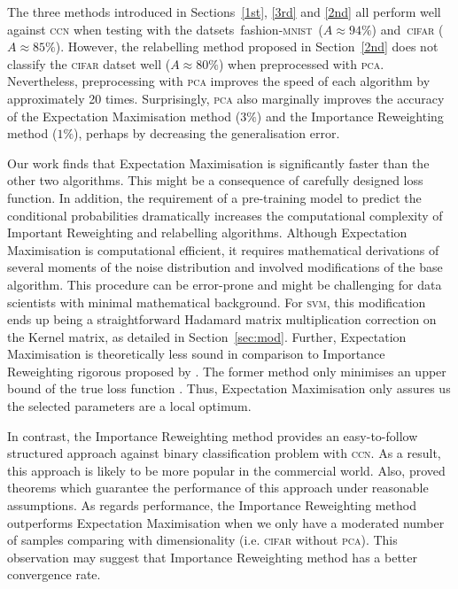 \documentclass[12pt]{article} %
\newcommand{\svm}{\textsc{svm}}
\newcommand{\mnist}{fashion-\textsc{mnist}}
\begin{document}

The three methods introduced in Sections~\ref{1st}, \ref{3rd} and \ref{2nd}  all perform well against \textsc{ccn} when testing with the datsets~\mnist\ ($A\approx 94\%$) and~\textsc{cifar} ($A\approx 85\%$). However, the relabelling method proposed in Section~\ref{2nd} does not classify the \textsc{cifar} datset well ($A\approx 80\%$) when preprocessed with \textsc{pca}. Nevertheless, preprocessing with \textsc{pca} improves the speed of each algorithm by approximately 20 times. Surprisingly, \textsc{pca} also marginally improves the accuracy of the Expectation Maximisation method ($3\%$) and the Importance Reweighting method ($1\%$), perhaps by decreasing the generalisation error.


Our work finds that Expectation Maximisation is significantly faster than the other two algorithms. This might be a consequence of carefully designed loss function. In addition, the requirement of a pre-training model to predict the conditional probabilities dramatically increases the computational complexity of Important Reweighting and relabelling algorithms. Although Expectation Maximisation is computational efficient, it requires mathematical derivations of several moments of the noise distribution and involved modifications of the base algorithm. This procedure can be error-prone and might be challenging for data scientists with minimal mathematical background. For \svm , this modification ends up being a straightforward Hadamard matrix multiplication correction on the Kernel matrix, as detailed in Section~\ref{sec:mod}. Further, Expectation Maximisation is theoretically less sound in comparison to Importance Reweighting rigorous proposed by \citet{liu2016classification}. The former method only minimises an upper bound of the true loss function \citep{NIPS1999_1672}. Thus, Expectation Maximisation only assures us the selected parameters are a local optimum.

In contrast, the Importance Reweighting method provides an easy-to-follow structured approach against binary classification problem with \textsc{ccn}. As a result, this approach is likely to be more popular in the commercial world. Also, \citet{liu2016classification} proved theorems which guarantee the performance of this approach under reasonable assumptions. As regards performance, the Importance Reweighting method outperforms Expectation Maximisation when we only have a moderated number of samples comparing with dimensionality (i.e. \textsc{cifar} without \textsc{pca}). This observation may suggest that Importance Reweighting method has a better convergence rate. 
\end{document}
